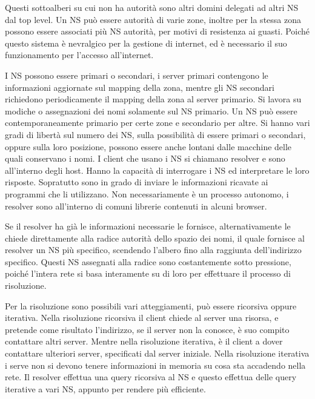 \documentclass{article}
\numberwithin{equation}{subsection}
\begin{document}

Questi sottoalberi su cui non ha autorità sono altri domini delegati ad altri NS dal top level. Un NS può essere autorità di varie zone, inoltre per la stessa zona 
possono essere associati più NS autorità, per motivi di resistenza ai guasti. Poiché questo sistema è nevralgico per la gestione di internet, ed è necessario il suo 
funzionamento per l'accesso all'internet. 

I NS possono essere primari o secondari, i server primari contengono le informazioni aggiornate sul mapping della zona, mentre gli NS secondari richiedono periodicamente 
il mapping della zona al server primario. Si lavora su modiche o assegnazioni dei nomi solamente sul NS primario. 
Un NS può essere contemporaneamente primario per certe zone e secondario per altre. Si hanno vari gradi di libertà sul numero dei NS, sulla possibilità di essere 
primari o secondari, oppure sulla loro posizione, possono essere anche lontani dalle macchine delle quali conservano i nomi. 
I client che usano i NS si chiamano resolver e sono all'interno degli host. Hanno la capacità di interrogare i NS ed interpretare le loro risposte. Sopratutto 
sono in grado di inviare le informazioni ricavate ai programmi che li utilizzano. 
Non necessariamente è un processo autonomo, i resolver sono all'interno di comuni librerie contenuti in alcuni browser. 

Se il resolver ha già le informazioni necessarie le fornisce, alternativamente le chiede direttamente alla radice autorità dello spazio dei nomi, il quale 
fornisce al resolver un NS più specifico, scendendo l'albero fino alla raggiunta dell'indirizzo specifico. Questi NS assegnati alla radice sono costantemente 
sotto pressione, poiché l'intera rete si basa interamente su di loro per effettuare il processo di risoluzione. 

Per la risoluzione sono possibili vari atteggiamenti, può essere ricorsiva oppure iterativa. Nella risoluzione ricorsiva il client chiede al server una risorsa, 
e pretende come risultato l'indirizzo, se il server non la conosce, è suo compito contattare altri server. Mentre nella risoluzione iterativa, è il client a dover 
contattare ulteriori server, specificati dal server iniziale. Nella risoluzione iterativa i serve non si devono tenere informazioni in memoria su cosa sta 
accadendo nella rete. 
Il resolver effettua una query ricorsiva al NS e questo effettua delle query iterative a vari NS, appunto per rendere più efficiente. 
\end{document}
